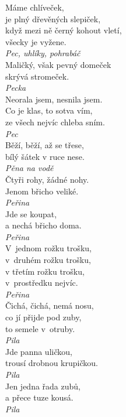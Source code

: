 \begin{multicols}{\value{columnsthindata}}
\noindent
Máme chlíveček,\\
je plný dřevěných slepiček,\\
když mezi ně černý kohout vletí,\\
všecky je vyžene.\\[1 mm]
{\sl Pec, uhlíky, pohrabáč}\\

\noindent
Maličký, však pevný domeček\\
skrývá stromeček.\\[1 mm]
{\sl Pecka}\\

\noindent
Neorala jsem, nesnila jsem.\\
Co je klas, to sotva vím,\\
ze všech nejvíc chleba sním.\\[1 mm]
{\sl Pec}\\

\noindent
Běží, běží, až se třese,\\
bílý šátek v ruce nese.\\[1 mm]
{\sl Pěna na vodě}\\

\noindent
Čtyři rohy, žádné nohy.\\
Jenom břicho veliké.\\[1 mm]
{\sl Peřina}\\

\noindent
Jde se koupat,\\
a nechá břicho doma.\\[1 mm]
{\sl Peřina}\\

\noindent
V~jednom rožku trošku,\\
v~druhém rožku trošku,\\
v třetím rožku trošku,\\
v~prostředku nejvíc.\\[1 mm]
{\sl Peřina}\\

\noindent
Čichá, čichá, nemá nosu,\\
co jí přijde pod zuby,\\
to semele v~otruby.\\[1 mm]
{\sl Pila}\\

\noindent
Jde panna uličkou,\\
trousí drobnou krupičkou.\\[1 mm]
{\sl Pila}\\

\noindent
Jen jedna řada zubů,\\
a přece tuze kousá.\\[1 mm]
{\sl Pila}\\


\end{multicols}
